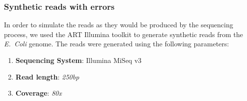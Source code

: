 \subsubsection{Synthetic reads with errors}

In order to simulate the reads as they would be produced by the sequencing process, we used the ART Illumina toolkit to generate
synthetic reads from the \emph{E.~Coli} genome. The reads were generated using the following parameters:

\begin{enumerate}
\item \textbf{Sequencing System}: Illumina MiSeq v3
\item \textbf{Read length}: \textit{250bp}
\item \textbf{Coverage}: \textit{80x}
\end{enumerate}